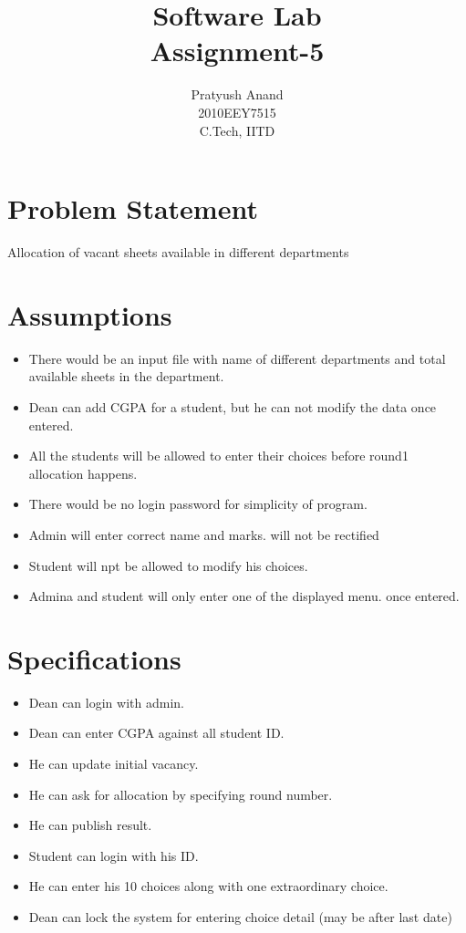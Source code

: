 \documentclass[a4paper,10pt]{report} %
\title{Software Lab \\Assignment-5}
\author{Pratyush Anand \\2010EEY7515 \\C.Tech, IITD}
\begin{document}
  \maketitle

  \chapter{Problem Statement}
    Allocation of vacant sheets available in different departments
\chapter{Assumptions}
\begin{itemize}
  \item There would be an input file with name of different departments and total available sheets in the department.
  \item Dean can add CGPA for a student, but he can not modify the data once entered.
  \item All the students will  be allowed to enter their choices before round1 allocation happens.
  \item There would be no login password for simplicity of program.
  \item Admin will enter correct name and marks. will not be rectified
  \item Student will npt be allowed to modify his choices.
  \item Admina and student will only enter one of the displayed menu.
  once entered.
\end{itemize}
\chapter{Specifications}

\begin{itemize}
 \item Dean can login with admin.
 \item Dean can enter CGPA against all student ID.
 \item He can update initial vacancy.
 \item He can ask for allocation by specifying round number.
 \item He can publish result.
 \item Student can login with his ID.
 \item He can enter his 10 choices along with one extraordinary choice.
\item Dean can lock the system for entering choice detail (may be after last date)

\end{itemize}
\end{document}
